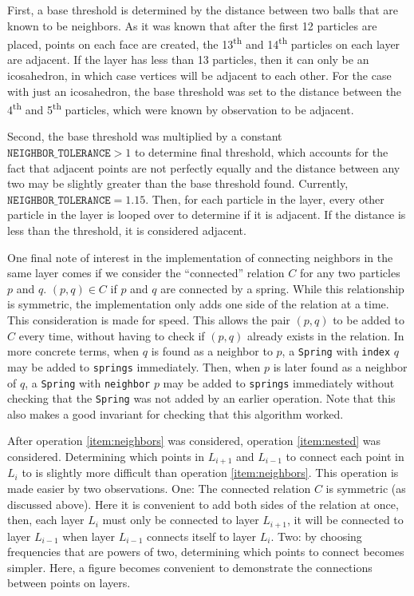 \documentclass{article}
\begin{document}
First, a base threshold is determined by the distance between two balls that are known to be neighbors. As it was known that after the first 12 particles are placed, points on each face are created, the 13\textsuperscript{th} and 14\textsuperscript{th} particles on each layer are adjacent. If the layer has less than 13 particles, then it can only be an icosahedron, in which case vertices will be adjacent to each other. For the case with just an icosahedron, the base threshold was set to the distance between the 4\textsuperscript{th} and 5\textsuperscript{th} particles, which were known by observation to be adjacent.

Second, the base threshold was multiplied by a constant $\texttt{NEIGHBOR\_TOLERANCE} > 1$ to determine final threshold, which accounts for the fact that adjacent points are not perfectly equally and the distance between any two may be slightly greater than the base threshold found. Currently, $\texttt{NEIGHBOR\_TOLERANCE} = 1.15$. Then, for each particle in the layer, every other particle in the layer is looped over to determine if it is adjacent. If the distance is less than the threshold, it is considered adjacent.

One final note of interest in the implementation of connecting neighbors in the same layer comes if we consider the ``connected'' relation $C$ for any two particles $p$ and $q$. $(p, q) \in C$ if $p$ and $q$ are connected by a spring. While this relationship is symmetric, the implementation only adds one side of the relation at a time. This consideration is made for speed. This allows the pair $(p, q)$ to be added to $C$ every time, without having to check if $(p, q)$ already exists in the relation. In more concrete terms, when $q$ is found as a neighbor to $p$, a \texttt{Spring} with \texttt{index} $q$ may be added to \texttt{springs} immediately. Then, when $p$ is later found as a neighbor of $q$, a \texttt{Spring} with \texttt{neighbor} $p$ may be added to \texttt{springs} immediately without checking that the \texttt{Spring} was not added by an earlier operation. Note that this also makes a good invariant for checking that this algorithm worked.

After operation \ref{item:neighbors} was considered, operation \ref{item:nested} was considered. Determining which points in $L_{i + 1}$ and $L_{i - 1}$ to connect each point in $L_{i}$ to is slightly more dif\mbox{f}icult than operation \ref{item:neighbors}. This operation is made easier by two observations. One: The connected relation $C$ is symmetric (as discussed above). Here it is convenient to add both sides of the relation at once, then, each layer $L_{i}$ must only be connected to layer $L_{i + 1}$, it will be connected to layer $L_{i - 1}$ when layer $L_{i - 1}$ connects itself to layer $L_{i}$. Two: by choosing frequencies that are powers of two, determining which points to connect becomes simpler. Here, a figure becomes convenient to demonstrate the connections between points on layers.
\end{document}
